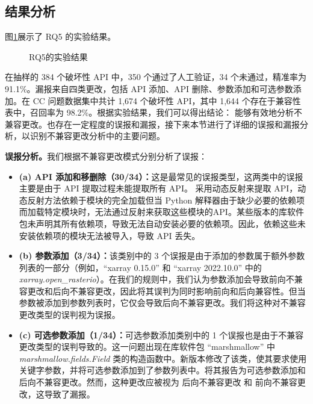 \subsection{结果分析}
图\ref{fig:RQ5}展示了 RQ5 的实验结果。

\begin{figure}[t]
	\centering
	\subfloat[分析不兼容更改的精确率]{
		\texttt{[image: RQ2-1]}
		\label{fig:RQ5-1}
	}\hspace{4em}
	\subfloat[分析不兼容更改的召回率]{
		\texttt{[image: RQ2-2]}
		\label{fig:RQ5-2}
	}
	\caption{RQ5的实验结果}
	\label{fig:RQ5}
\end{figure}

在抽样的 384 个破坏性 API 中，350 个通过了人工验证，34 个未通过，精准率为 91.1\%。漏报来自四类更改，包括 API 添加、API 删除、参数添加和可选参数添加。在 CC 问题数据集中共计 1,674 个破坏性 API，其中 1,644 个存在于兼容性表中，召回率为 98.2\%。根据实验结果，我们可以得出结论：\tool{} 能够有效地分析不兼容更改。\tool{}也存在一定程度的误报和漏报，接下来本节进行了详细的误报和漏报分析，以识别不兼容更改分析中的主要问题。

\textbf{误报分析。}我们根据不兼容更改模式分别分析了误报：
\begin{itemize}
	\item \textbf{(a) API 添加和移删除（30/34）：}这是最常见的误报类型，这两类中的误报主要是由于 API 提取过程未能提取所有 API。\tool{} 采用动态反射来提取 API，动态反射方法依赖于模块的完全加载但当 Python 解释器由于缺少必要的依赖项而加载特定模块时，\tool{}无法通过反射来获取这些模块的API。某些版本的库软件包未声明其所有依赖项，导致无法自动安装必要的依赖项。因此，依赖这些未安装依赖项的模块无法被导入，导致 API 丢失。
	\item \textbf{ (b) 参数添加（3/34）：}该类别中的 3 个误报是由于添加的参数属于额外参数列表的一部分（例如，“xarray 0.15.0” 和 “xarray 2022.10.0”  中的 \textit{xarray.open\_rasterio}）。在我们的规则中，我们认为参数添加会导致前向不兼容更改和后向不兼容更改，因此\tool{}将其误判为同时影响前向和后向兼容性。但当参数被添加到参数列表时，它仅会导致后向不兼容更改。我们将这种对不兼容更改类型的误判视为误报。
	\item \textbf{ (c) 可选参数添加（1/34）：}可选参数添加类别中的 1 个误报也是由于不兼容更改类型的误判导致的。这一问题出现在库软件包 “marshmallow”  中\textit{ marshmallow.fields.Field} 类的构造函数中。新版本修改了该类，使其要求使用关键字参数，并将可选参数添加到了参数列表中。\tool{}将其报告为可选参数添加和后向不兼容更改。然而，这种更改应被视为 后向不兼容更改 和 前向不兼容更改，这导致了漏报。
\end{itemize}

